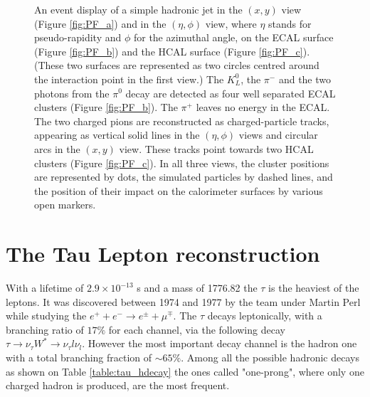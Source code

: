\begin{figure}
	\caption{An event display of a simple hadronic jet in the $(x, y)$ view (Figure \ref{fig:PF_a}) and in the $(\eta,\phi)$ view, where $\eta$ stands for pseudo-rapidity and $\phi$ for the azimuthal angle, on the ECAL surface (Figure \ref{fig:PF_b}) and the HCAL surface (Figure \ref{fig:PF_c}). (These two surfaces are represented as two circles centred around the interaction point in the first view.) The $K^{0}_{L}$, the $\pi^{-}$ and the two photons from the $\pi^{0}$ decay are detected as four well separated ECAL clusters (Figure \ref{fig:PF_b}). The $\pi^{+}$ leaves no energy in the ECAL. The two charged pions are reconstructed as charged-particle tracks, appearing as vertical solid lines in the $(\eta,\phi)$ views and circular arcs in the $(x, y)$ view. These tracks point towards two HCAL clusters (Figure \ref{fig:PF_c}). In all three views, the cluster positions are represented by dots, the simulated particles by dashed lines, and the position of their impact on the calorimeter surfaces by various open markers.}
	\label{fig:PF_event_display}
\end{figure}

\section {The Tau Lepton reconstruction}

With a lifetime of $2.9\times10^{−13}$ s and a mass of 1776.82 \mev the $\tau$ is the heaviest of the leptons. It was discovered between 1974 and 1977 by the team under Martin Perl while studying the $e^{+}+e^{-}\longrightarrow e^{\pm}+\mu^{\mp}$. The $\tau$ decays leptonically, with a branching ratio of $17\%$ for each channel, via the following decay $\tau\longrightarrow\nu_{\tau}W^{*}\longrightarrow\nu_{\tau}l\nu_{l}$. However the most important decay channel is the hadron one with a total branching fraction of $\sim 65\%$. Among all the possible hadronic decays as shown on Table \ref{table:tau_hdecay} the ones called "one-prong", where only one charged hadron is produced, are the most frequent.


